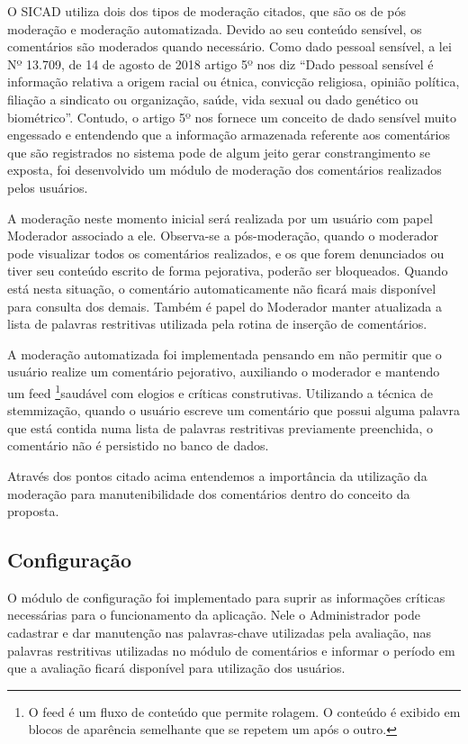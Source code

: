 \documentclass[12pt, a4paper]{report}
\begin{document}
O SICAD utiliza dois dos tipos de moderação citados, que são os de pós moderação e moderação automatizada. Devido ao seu conteúdo sensível, os comentários são moderados quando necessário. Como dado pessoal sensível, a lei Nº 13.709, de 14 de agosto de 2018 artigo 5º nos diz ``Dado pessoal sensível é informação relativa a origem racial ou étnica, convicção religiosa, opinião política, filiação a sindicato ou organização, saúde, vida sexual ou dado genético ou biométrico''.  Contudo, o artigo 5º nos fornece um conceito de dado sensível muito engessado e entendendo que a informação armazenada referente aos comentários que são registrados no sistema pode de algum jeito gerar constrangimento se exposta, foi desenvolvido um módulo de moderação dos comentários realizados pelos usuários.

A moderação neste momento inicial será realizada por um usuário com papel Moderador associado a ele. Observa-se a pós-moderação, quando o moderador pode visualizar todos os comentários realizados, e os que forem denunciados ou tiver seu conteúdo escrito de forma pejorativa, poderão ser bloqueados. Quando está nesta situação, o comentário automaticamente não ficará mais disponível para consulta dos demais. Também é papel do Moderador manter atualizada a lista de palavras restritivas utilizada pela rotina de inserção de comentários. 

A moderação automatizada foi implementada pensando em não permitir que o usuário realize um comentário pejorativo, auxiliando o moderador e mantendo um feed \footnote{O feed é um fluxo de conteúdo que permite rolagem. O conteúdo é exibido em blocos de aparência semelhante que se repetem um após o outro.}saudável com elogios e críticas construtivas. Utilizando a técnica de stemmização, quando o usuário escreve um comentário que possui alguma palavra que está contida numa lista de palavras restritivas previamente preenchida, o comentário não é persistido no banco de dados.  

Através dos pontos citado acima entendemos a importância da utilização da moderação para manutenibilidade dos comentários dentro do conceito da proposta.

\subsection{Configuração}
\label{subsection:configuracao}
O módulo de configuração foi implementado para suprir as informações críticas necessárias para o funcionamento da aplicação. Nele o Administrador pode cadastrar e dar manutenção nas palavras-chave utilizadas pela avaliação, nas palavras restritivas utilizadas no módulo de comentários e informar o período em que a avaliação ficará disponível para utilização dos usuários.
\end{document}
